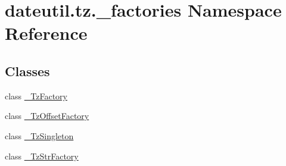 \hypertarget{namespacedateutil_1_1tz_1_1__factories}{}\section{dateutil.\+tz.\+\_\+factories Namespace Reference}
\label{namespacedateutil_1_1tz_1_1__factories}
\subsection*{Classes}
\begin{DoxyCompactItemize}
\item 
class \hyperlink{classdateutil_1_1tz_1_1__factories_1_1__TzFactory}{\+\_\+\+Tz\+Factory}
\item 
class \hyperlink{classdateutil_1_1tz_1_1__factories_1_1__TzOffsetFactory}{\+\_\+\+Tz\+Offset\+Factory}
\item 
class \hyperlink{classdateutil_1_1tz_1_1__factories_1_1__TzSingleton}{\+\_\+\+Tz\+Singleton}
\item 
class \hyperlink{classdateutil_1_1tz_1_1__factories_1_1__TzStrFactory}{\+\_\+\+Tz\+Str\+Factory}
\end{DoxyCompactItemize}
